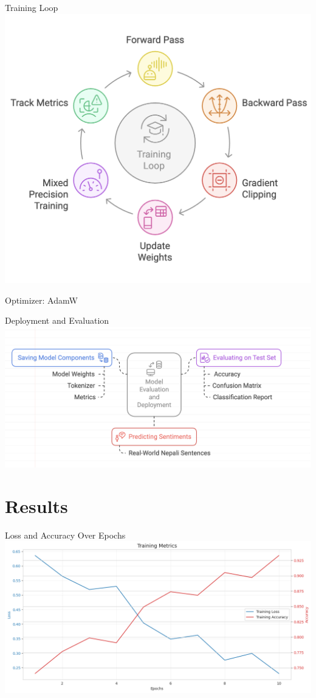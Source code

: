 \documentclass[aspectratio=169]{beamer}
\begin{document}
\begin{frame}{Training Loop}
  \centering
  \includegraphics[width=0.55\linewidth]{trainLoop.png}

\footnotesize{Optimizer: AdamW \parencite{loshchilov2019decoupledweightdecayregularization}}
\end{frame}

\begin{frame}{Deployment and Evaluation}
  \centering
  \includegraphics[width=0.95\linewidth]{deployment.png}
\end{frame}

\section{Results}
\begin{frame}{Loss and Accuracy Over Epochs}
  \centering
  \includegraphics[width=0.75\linewidth]{training_metrics.png}
\end{frame}
\end{document}
